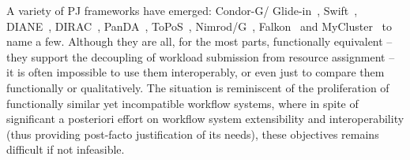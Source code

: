 \documentclass[conference]{IEEEtran}
\begin{document}
A variety of PJ frameworks have emerged: Condor-G/
Glide-in~\cite{condor-g}, Swift~\cite{Wilde2011},
DIANE~\cite{Moscicki:908910}, DIRAC~\cite{1742-6596-219-6-062049},
PanDA~\cite{1742-6596-219-6-062041}, ToPoS~\cite{topos},
Nimrod/G~\cite{10.1109/HPC.2000.846563}, Falkon~\cite{1362680} and
MyCluster~\cite{1652061} to name a few. Although they are all, for the
most parts, functionally equivalent -- they support the decoupling of
workload submission from resource assignment -- it is often impossible
to use them interoperably, or even just to compare them functionally
or qualitatively.  The situation is reminiscent of the proliferation
of functionally similar yet incompatible workflow systems, where in
spite of significant a posteriori effort on workflow system
extensibility and interoperability (thus providing post-facto
justification of its needs), these objectives remains difficult if not
infeasible.









\end{document}
